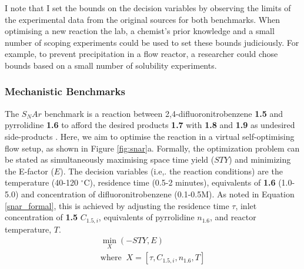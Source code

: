 I note that I set the bounds on the decision variables by observing the limits of the experimental data from the original sources for both benchmarks. When optimising a new reaction the lab, a chemist's prior knowledge and a small number of scoping experiments could be used to set these bounds judiciously. For example, to prevent precipitation in a flow reactor, a researcher could chose bounds based on a small number of solubility experiments.

\subsubsection{Mechanistic Benchmarks}



The $S_NAr$ benchmark is a reaction between 2,4-difluoronitrobenzene \textbf{1.5} and pyrrolidine \textbf{1.6} to afford the desired products \textbf{1.7} with \textbf{1.8} and \textbf{1.9} as undesired side-products \cite{Hone2017}. Here, we aim to optimise the reaction in a virtual self-optimising flow setup, as shown in Figure \ref{fig:snar}a. Formally, the optimization problem can be stated as simultaneously maximising space time yield ($STY$) and minimizing the E-factor ($E$). The decision variables (i.e,. the reaction conditions) are the temperature (40-120 $^{\circ}$C), residence time (0.5-2 minutes), equivalents of \textbf{1.6} (1.0-5.0) and concentration of difluoronitrobenzene (0.1-0.5M).   As noted in Equation \ref{snar_formal}, this is achieved by adjusting the residence time $\tau$, inlet concentration of \textbf{1.5} $C_{1.5,i}$, equivalents of pyrrolidine $n_{1.6}$, and reactor temperature, $T$.
\begin{equation}
	\label{snar_formal}
	\begin{gathered}
		\min_{X}{(-STY, E)} \\
		\text{where}\;\; X = [\tau,C_{1.5,i},n_{1.6}, T]
	\end{gathered}
\end{equation}


